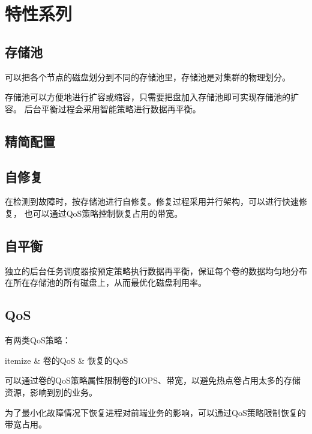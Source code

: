 \chapter{特性系列}

\section{存储池}

可以把各个节点的磁盘划分到不同的存储池里，存储池是对集群的物理划分。

存储池可以方便地进行扩容或缩容，只需要把盘加入存储池即可实现存储池的扩容。
后台平衡过程会采用智能策略进行数据再平衡。

\section{精简配置}

\section{自修复}

在检测到故障时，按存储池进行自修复。修复过程采用并行架构，可以进行快速修复，
也可以通过QoS策略控制恢复占用的带宽。

\section{自平衡}

独立的后台任务调度器按预定策略执行数据再平衡，保证每个卷的数据均匀地分布在所在存储池的所有磁盘上，从而最优化磁盘利用率。

\section{QoS}

有两类QoS策略：
\begin{myeasylist}{itemize}
& 卷的QoS
& 恢复的QoS
\end{myeasylist}

可以通过卷的QoS策略属性限制卷的IOPS、带宽，以避免热点卷占用太多的存储资源，影响到别的业务。

为了最小化故障情况下恢复进程对前端业务的影响，可以通过QoS策略限制恢复的带宽占用。
